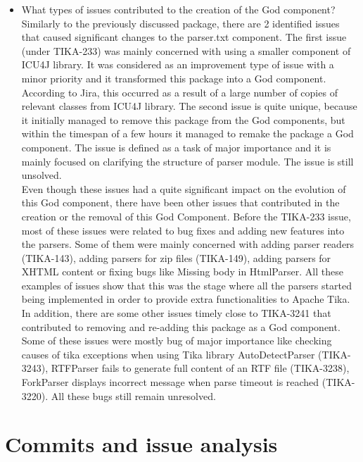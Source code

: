 \documentclass{article}
\begin{document}
\begin{itemize}
    \item	What types of issues contributed to the creation of the God component?\\
    
    Similarly to the previously discussed package, there are 2 identified issues that caused significant changes to the parser.txt component. The first issue (under TIKA-233) was mainly concerned with using a smaller component of ICU4J library. It was considered as an improvement type of issue with a minor priority and it transformed this package into a God component. According to Jira, this occurred as a result of a large number of copies of relevant classes from ICU4J library. The second issue is quite unique, because it initially managed to remove this package from the God components, but within the timespan of a few hours it managed to remake the package a God component. The issue is defined as a task of major importance and it is mainly focused on clarifying the structure of parser module. The issue is still unsolved.\\
    Even though these issues had a quite significant impact on the evolution of this God component, there have been other issues that contributed in the creation or the removal of this God Component. Before the TIKA-233 issue, most of these issues were related to bug fixes and adding new features into the parsers. Some of them were mainly concerned with adding parser readers (TIKA-143), adding parsers for zip files (TIKA-149), adding parsers for XHTML content or fixing bugs like Missing body in HtmlParser. All these examples of issues show that this was the stage where all the parsers started being implemented in order to provide extra functionalities to Apache Tika. In addition, there are some other issues timely close to TIKA-3241 that contributed to removing and re-adding this package as a God component. Some of these issues were mostly bug of major importance like checking causes of tika exceptions when using  Tika library AutoDetectParser (TIKA-3243), RTFParser fails to generate full content of an RTF file (TIKA-3238), ForkParser displays incorrect message when parse timeout is reached (TIKA-3220). All these bugs still remain unresolved.

\end{itemize}
\pagebreak
\section{Commits and issue analysis}
\end{document}
